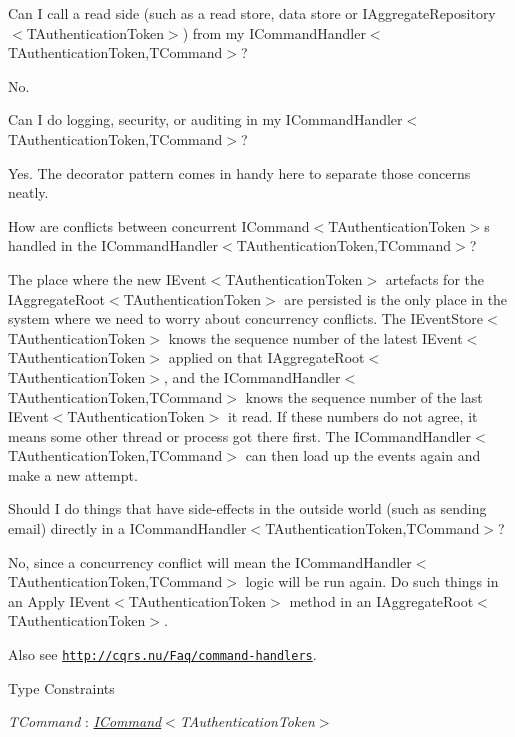 Can I call a read side (such as a read store, data store or I\+Aggregate\+Repository$<$\+T\+Authentication\+Token$>$) from my I\+Command\+Handler$<$\+T\+Authentication\+Token,\+T\+Command$>$?

No.

Can I do logging, security, or auditing in my I\+Command\+Handler$<$\+T\+Authentication\+Token,\+T\+Command$>$?

Yes. The decorator pattern comes in handy here to separate those concerns neatly.

How are conflicts between concurrent I\+Command$<$\+T\+Authentication\+Token$>$s handled in the I\+Command\+Handler$<$\+T\+Authentication\+Token,\+T\+Command$>$?

The place where the new I\+Event$<$\+T\+Authentication\+Token$>$ artefacts for the I\+Aggregate\+Root$<$\+T\+Authentication\+Token$>$ are persisted is the only place in the system where we need to worry about concurrency conflicts. The I\+Event\+Store$<$\+T\+Authentication\+Token$>$ knows the sequence number of the latest I\+Event$<$\+T\+Authentication\+Token$>$ applied on that I\+Aggregate\+Root$<$\+T\+Authentication\+Token$>$, and the I\+Command\+Handler$<$\+T\+Authentication\+Token,\+T\+Command$>$ knows the sequence number of the last I\+Event$<$\+T\+Authentication\+Token$>$ it read. If these numbers do not agree, it means some other thread or process got there first. The I\+Command\+Handler$<$\+T\+Authentication\+Token,\+T\+Command$>$ can then load up the events again and make a new attempt.

Should I do things that have side-\/effects in the outside world (such as sending email) directly in a I\+Command\+Handler$<$\+T\+Authentication\+Token,\+T\+Command$>$?

No, since a concurrency conflict will mean the I\+Command\+Handler$<$\+T\+Authentication\+Token,\+T\+Command$>$ logic will be run again. Do such things in an Apply I\+Event$<$\+T\+Authentication\+Token$>$ method in an I\+Aggregate\+Root$<$\+T\+Authentication\+Token$>$. 

 Also see \href{http://cqrs.nu/Faq/command-handlers}{\tt http\+://cqrs.\+nu/\+Faq/command-\/handlers}. \begin{Desc}
\item[Type Constraints]\begin{description}
\item[{\em T\+Command} : {\em \hyperlink{interfaceCqrs_1_1Commands_1_1ICommand}{I\+Command}$<$T\+Authentication\+Token$>$}]\end{description}
\end{Desc}
